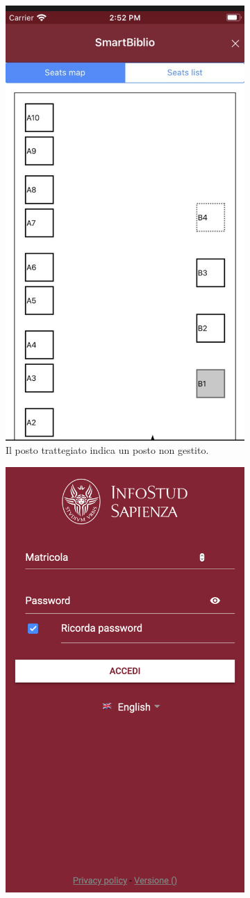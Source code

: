 \documentclass[Lau, oneside, noexaminfo]{sapthesis}%
\begin{document}
\begin{figure}[H]
	\begin{subfigure}{0.6\textwidth}
		\label{subfig:1}
		\centering
		\includegraphics[width=0.5\linewidth]{issues/sb-l}  
		\caption{Il posto trattegiato indica un posto non gestito.}
	\end{subfigure}
	\begin{subfigure}{0.6\textwidth}
		\label{subfig:2}
		\centering
		\includegraphics[width=0.5\linewidth]{issues/password}  

\end{subfigure}
\end{figure}
\end{document}
